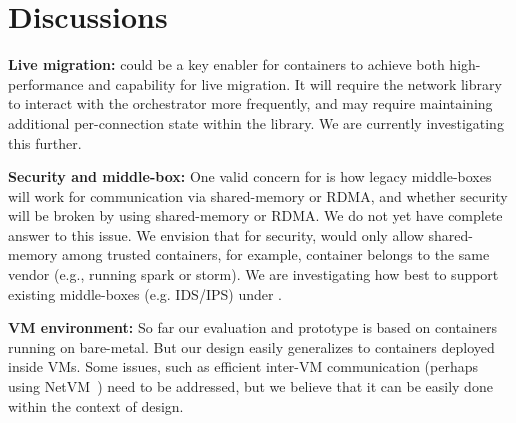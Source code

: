 \section{Discussions} \label{sec:discussion}

\textbf{Live migration:} 
\sysname could be a key enabler
for containers to achieve both high-performance and capability for live
migration. It will require the network library to interact with the orchestrator
more frequently, and may require maintaining additional per-connection state
within the library. We are currently investigating this further.

\textbf{Security and middle-box:} One valid concern for \sysname is how legacy
middle-boxes will work for communication via shared-memory or RDMA, and whether
security will be broken by using shared-memory or RDMA.  We do not yet have
complete answer to this issue. We envision that for security, \sysname would
only allow shared-memory among trusted containers, for example, container
belongs to the same vendor (e.g., running spark or storm).  We are investigating
how best to support existing middle-boxes (e.g. IDS/IPS) under \sysname.


\textbf{VM environment:}
So far our evaluation and prototype is based on containers running on
bare-metal.  But our design easily generalizes to containers deployed inside
VMs. Some issues, such as efficient inter-VM communication (perhaps using
NetVM~\cite{netvm}) need to be addressed, but we believe that it can be easily
done within the context of \sysname design.


